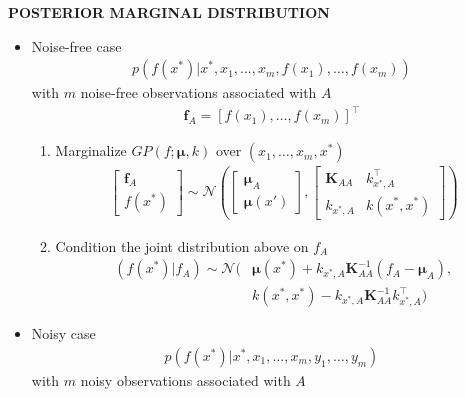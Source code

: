 \begin{whitebox}{\textbf{POSTERIOR MARGINAL DISTRIBUTION}}
    \begin{itemize}
        \item Noise-free case
        \begin{align*}
            p(f(x^*)|x^*,x_1,\dots,x_m,f(x_1),\dots,f(x_m))
        \end{align*}
        with $m$ noise-free observations associated with $A$
        \begin{align*}
            \bm{f}_A=[f(x_1),\dots,f(x_m)]^\top
        \end{align*}
        \begin{enumerate}
            \item Marginalize $GP(f;\bm{\mu},k)$ over $(x_1,\dots,x_m,x^*)$
            \begin{align*}
                \begin{bmatrix}
                    \bm{f}_A\\
                    f(x^*)
                \end{bmatrix}\sim\mathcal{N}\left(
                \begin{bmatrix}
                    \bm{\mu}_A\\
                    \bm{\mu}(x')
                \end{bmatrix},
                \begin{bmatrix}
                    \bm{K}_{AA} & k_{x^*,A}^\top\\
                    k_{x^*,A} & k(x^*,x^*)
                \end{bmatrix}\right)
            \end{align*}
            \item Condition the joint distribution above on $f_A$
            \begin{align*}
                (f(x^*)|f_A)\sim\mathcal{N}(&\bm{\mu}(x^*)+k_{x^*,A}\bm{K}_{AA}^{-1}(f_A-\bm{\mu}_A),\\
                &k(x^*,x^*)-k_{x^*,A}\bm{K}_{AA}^{-1}k_{x^*,A}^\top)
            \end{align*}
        \end{enumerate}
        \item Noisy case
        \begin{align*}
            p(f(x^*)|x^*,x_1,\dots,x_m,y_1,\dots,y_m)
        \end{align*}
        with $m$ noisy observations associated with $A$
        \begin{align*}

\end{align*}
\end{itemize}
\end{whitebox}
